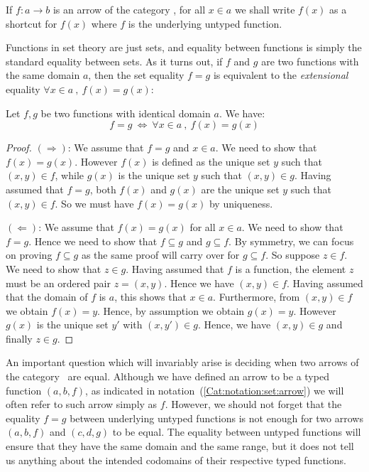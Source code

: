 \begin{notation}\label{Cat:notation:set:arrow:apply}
    If $f:a \to b$ is an arrow of the category \Set, 
    for all $x\in a$ we shall write $f(x)$ as a shortcut 
    for $f(x)$ where $f$ is the underlying untyped function.
\end{notation}

Functions in set theory are just sets, and equality between functions is 
simply the standard equality between sets. As it turns out, if $f$ and $g$
are two functions with the same domain $a$, then the set equality $f = g$
is equivalent to the {\em extensional} equality $\forall x\in a\ ,\ f(x)=g(x)$:

\begin{prop}\label{Cat:prop:functions:extensionality}
    Let $f,g$ be two functions with identical domain $a$. We have:
        \[
        f = g\ \Leftrightarrow\ \forall x\in a\ ,\ f(x)=g(x)
        \]
\end{prop}
\begin{proof}
    $(\Rightarrow)$: We assume that $f=g$ and $x\in a$. We need to show that 
    $f(x)=g(x)$. However $f(x)$ is defined as the unique set $y$ such that
    $(x,y)\in f$, while $g(x)$ is the unique set $y$ such that $(x,y)\in g$.
    Having assumed that $f=g$, both $f(x)$ and $g(x)$ are the unique set $y$
    such that $(x,y)\in f$. So we must have $f(x)=g(x)$ by uniqueness.

    \noindent
    $(\Leftarrow)$: We assume that $f(x)=g(x)$ for all $x\in a$. We need to show
    that $f=g$. Hence we need to show that $f\subseteq g$ and $g\subseteq f$.
    By symmetry, we can focus on proving $f\subseteq g$ as the same proof will
    carry over for $g\subseteq f$. So suppose $z\in f$. We need to show that 
    $z\in g$. Having assumed that $f$ is a function, the element $z$ must be
    an ordered pair $z=(x,y)$. Hence we have $(x,y)\in f$. Having assumed
    that the domain of $f$ is $a$, this shows that $x\in a$. Furthermore,
    from $(x,y)\in f$ we obtain $f(x)=y$. Hence, by assumption we obtain
    $g(x)=y$. However $g(x)$ is the unique set $y'$ with $(x,y')\in g$.
    Hence, we have $(x,y)\in g$ and finally $z\in g$.
\end{proof}

An important question which will invariably arise is deciding when two
arrows of the category \Set\ are equal. Although we have defined an
arrow to be a typed function $(a,b,f)$, as indicated in 
notation~(\ref{Cat:notation:set:arrow}) we will often refer to such
arrow simply as $f$. However, we should not forget that the equality
$f=g$ between underlying untyped functions is not enough for two arrows
$(a,b,f)$ and $(c,d,g)$ to be equal. The equality between untyped functions
will ensure that they have the same domain and the same
range, but it does not tell us anything
about the intended codomains of their respective typed functions.

